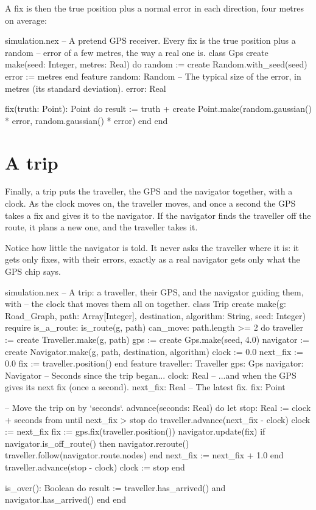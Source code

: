 A fix is then the true position plus a normal error in each direction,
four metres on average:

\begin{append}{simulation.nex}
-- A pretend GPS receiver. Every fix is the true position plus a random
-- error of a few metres, the way a real one is.
class Gps
create
  make(seed: Integer, metres: Real) do
    random := create Random.with_seed(seed)
    error := metres
  end
feature
  random: Random
  -- The typical size of the error, in metres (its standard deviation).
  error: Real

  fix(truth: Point): Point do
    result := truth + create Point.make(random.gaussian() * error, random.gaussian() * error)
  end
end
\end{append}

\section{A trip}

Finally, a trip puts the traveller, the GPS and the navigator together, with
a clock. As the clock moves on, the traveller moves, and once a second the
GPS takes a fix and gives it to the navigator. If the navigator finds the
traveller off the route, it plans a new one, and the traveller takes it.

Notice how little the navigator is told. It never asks the traveller where
it is: it gets only fixes, with their errors, exactly as a real navigator
gets only what the GPS chip says.

\begin{append}{simulation.nex}
-- A trip: a traveller, their GPS, and the navigator guiding them, with
-- the clock that moves them all on together.
class Trip
create
  make(g: Road_Graph, path: Array[Integer], destination, algorithm: String, seed: Integer)
  require
    is_a_route: is_route(g, path)
    can_move: path.length >= 2
  do
    traveller := create Traveller.make(g, path)
    gps := create Gps.make(seed, 4.0)
    navigator := create Navigator.make(g, path, destination, algorithm)
    clock := 0.0
    next_fix := 0.0
    fix := traveller.position()
  end
feature
  traveller: Traveller
  gps: Gps
  navigator: Navigator
  -- Seconds since the trip began...
  clock: Real
  -- ...and when the GPS gives its next fix (once a second).
  next_fix: Real
  -- The latest fix.
  fix: Point

  -- Move the trip on by `seconds`.
  advance(seconds: Real) do
    let stop: Real := clock + seconds
    from
    until
      next_fix > stop
    do
      traveller.advance(next_fix - clock)
      clock := next_fix
      fix := gps.fix(traveller.position())
      navigator.update(fix)
      if navigator.is_off_route() then
        navigator.reroute()
        traveller.follow(navigator.route.nodes)
      end
      next_fix := next_fix + 1.0
    end
    traveller.advance(stop - clock)
    clock := stop
  end

  is_over(): Boolean do
    result := traveller.has_arrived() and navigator.has_arrived()
  end
end
\end{append}

